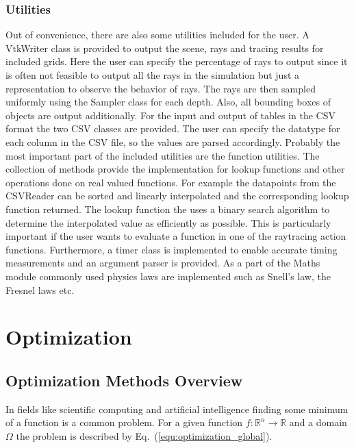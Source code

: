\documentclass[a4paper,10pt]{article}
\newcommand{\equref}[1]{Eq.~(\ref{#1})}
\begin{document}
    \subsubsection{Utilities} \label{sec:utilities}

    Out of convenience, there are also some utilities included for the user.
    A VtkWriter class is provided to output the scene, rays and tracing results
    for included grids.
    Here the user can specify the percentage of rays to output since
    it is often not feasible to output all the rays in the simulation
    but just a representation to observe the behavior of rays.
    The rays are then sampled uniformly using the Sampler class for each
    depth.
    Also, all bounding boxes of objects are output additionally.
    For the input and output of tables in the CSV format the two CSV classes
    are provided.
    The user can specify the datatype for each column in the CSV file, so
    the values are parsed accordingly.
    Probably the most important part of the included utilities are the
    function utilities.
    The collection of methods provide the implementation for lookup
    functions and other operations done on real valued functions.
    For example the datapoints from the CSVReader can be sorted and linearly
    interpolated and the corresponding lookup function returned.
    The lookup function the uses a binary search algorithm to determine
    the interpolated value as efficiently as possible.
    This is particularly important if the user wants to evaluate a function
    in one of the raytracing action functions.
    Furthermore, a timer class is implemented to enable accurate timing
    measurements and an argument parser is provided.
    As a part of the Maths module commonly used physics laws are implemented
    such as Snell's law, the Fresnel laws etc.

    \newpage
    \section{Optimization} \label{sec:optimization}

    \subsection{Optimization Methods Overview} \label{sec:opt_overview}

    In fields like scientific computing and artificial intelligence
    finding some minimum of a function is a common problem.
    For a given function $f : \mathbb{R}^n \rightarrow \mathbb{R}$ 
    and a domain $\Omega$ the problem is described by 
    \equref{equ:optimization_global}.
\end{document}
